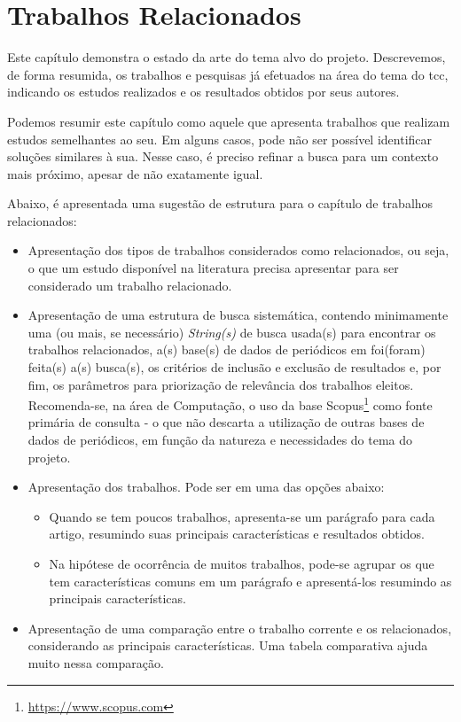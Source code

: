 \documentclass{eic-bcc-tcc}
\begin{document}
\chapter{Trabalhos Relacionados}
\label{cha:relacionados}

Este capítulo demonstra o estado da arte do tema alvo do projeto. Descrevemos, de forma resumida, os trabalhos e pesquisas já efetuados na área do tema do \gls{tcc}, indicando os estudos realizados e os resultados obtidos por seus autores.

Podemos resumir este capítulo como aquele que apresenta trabalhos que realizam estudos semelhantes ao seu. Em alguns casos, pode não ser possível identificar soluções similares à sua. Nesse caso, é preciso refinar a busca para um contexto mais próximo, apesar de não exatamente igual.

Abaixo, é apresentada uma sugestão de estrutura para o capítulo de trabalhos relacionados:
\begin{itemize}
    \item Apresentação dos tipos de trabalhos considerados como relacionados, ou seja, o que um estudo disponível na literatura precisa apresentar para ser considerado um trabalho relacionado.
    
    \item Apresentação de uma estrutura de busca sistemática, contendo minimamente uma (ou mais, se necessário) \textit{String(s)} de busca usada(s) para encontrar os trabalhos relacionados, a(s) base(s) de dados de periódicos em foi(foram) feita(s) a(s) busca(s), os critérios de inclusão e exclusão de resultados e, por fim, os parâmetros para priorização de relevância dos trabalhos eleitos. Recomenda-se, na área de Computação, o uso da base Scopus\footnote{\url{https://www.scopus.com}} como fonte primária de consulta - o que não descarta a utilização de outras bases de dados de periódicos, em função da natureza e necessidades do tema do projeto.
    
    \item Apresentação dos trabalhos. Pode ser em uma das opções abaixo:
    \begin{itemize}
        \item Quando se tem poucos trabalhos, apresenta-se um parágrafo para cada artigo, resumindo suas principais características e resultados obtidos.
        \item Na hipótese de ocorrência de muitos trabalhos, pode-se agrupar os que tem características comuns em um parágrafo e apresentá-los resumindo as principais características.
    \end{itemize}
    
    \item Apresentação de uma comparação entre o trabalho corrente e os relacionados, considerando as principais características. Uma tabela comparativa ajuda muito nessa comparação.
\end{itemize}
\end{document}
